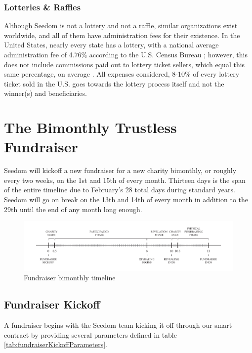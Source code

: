 \documentclass[11pt]{article}
\begin{document}
\subsubsection{Lotteries \& Raffles}

Although Seedom is not a lottery and not a raffle, similar organizations exist worldwide, and all of them have administration fees for their existence. In the United States, nearly every state has a lottery, with a national average administration fee of 4.76\% according to the U.S. Census Bureau \cite{3}; however, this does not include commissions paid out to lottery ticket sellers, which equal this same percentage, on average \cite{4}. All expenses considered, 8-10\% of every lottery ticket sold in the U.S. goes towards the lottery process itself and not the winner(s) and beneficiaries.

\section{The Bimonthly Trustless Fundraiser}

Seedom will kickoff a new fundraiser for a new charity bimonthly, or roughly every two weeks, on the 1st and 15th of every month. Thirteen days is the span of the entire timeline due to February's 28 total days during standard years. Seedom will go on break on the 13th and 14th of every month in addition to the 29th until the end of any month long enough.

\begin{figure}[H]
\begin{center}
\includegraphics[width=1.0\textwidth]{fundraiserBimonthlyTimeline.pdf}
\caption{Fundraiser bimonthly timeline}
\label{figure:fundraiserBimonthlyTimeline}
\end{center}
\end{figure}

\subsection{Fundraiser Kickoff}
A fundraiser begins with the Seedom team kicking it off through our smart contract by providing several parameters defined in table \ref{tab:fundraiserKickoffParameters}.
\end{document}
